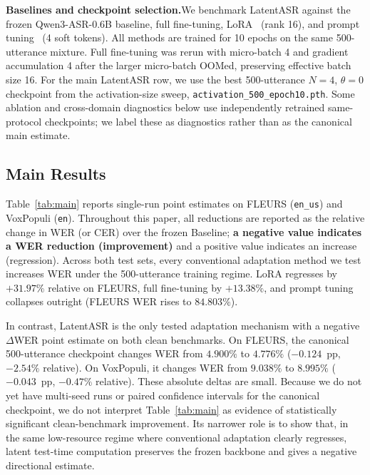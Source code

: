 \documentclass[a4paper]{article}
\newcommand{\method}{LatentASR}
\begin{document}
\textbf{Baselines and checkpoint selection.}\quad We benchmark \method{} against the frozen Qwen3-ASR-0.6B baseline, full fine-tuning, LoRA~\cite{hu2022lora} (rank 16), and prompt tuning~\cite{lester2021power} (4 soft tokens). All methods are trained for 10 epochs on the same 500-utterance mixture. Full fine-tuning was rerun with micro-batch 4 and gradient accumulation 4 after the larger micro-batch OOMed, preserving effective batch size 16. For the main \method{} row, we use the best 500-utterance $N{=}4$, $\theta{=}0$ checkpoint from the activation-size sweep, \texttt{activation\_500\_epoch10.pth}. Some ablation and cross-domain diagnostics below use independently retrained same-protocol checkpoints; we label these as diagnostics rather than as the canonical main estimate.

\subsection{Main Results}
\label{sec:main_results}

Table~\ref{tab:main} reports single-run point estimates on FLEURS (\texttt{en\_us}) and VoxPopuli (\texttt{en}). Throughout this paper, all reductions are reported as the relative change in WER (or CER) over the frozen Baseline; \textbf{a negative value indicates a WER reduction (improvement)} and a positive value indicates an increase (regression). Across both test sets, every conventional adaptation method we test increases WER under the 500-utterance training regime. LoRA regresses by $+31.97\%$ relative on FLEURS, full fine-tuning by $+13.38\%$, and prompt tuning collapses outright (FLEURS WER rises to $84.803\%$).

In contrast, \method{} is the only tested adaptation mechanism with a negative $\Delta$WER point estimate on both clean benchmarks. On FLEURS, the canonical 500-utterance checkpoint changes WER from $4.900\%$ to $4.776\%$ ($-0.124$~pp, $-2.54\%$ relative). On VoxPopuli, it changes WER from $9.038\%$ to $8.995\%$ ($-0.043$~pp, $-0.47\%$ relative). These absolute deltas are small. Because we do not yet have multi-seed runs or paired confidence intervals for the canonical checkpoint, we do not interpret Table~\ref{tab:main} as evidence of statistically significant clean-benchmark improvement. Its narrower role is to show that, in the same low-resource regime where conventional adaptation clearly regresses, latent test-time computation preserves the frozen backbone and gives a negative directional estimate.
\end{document}
